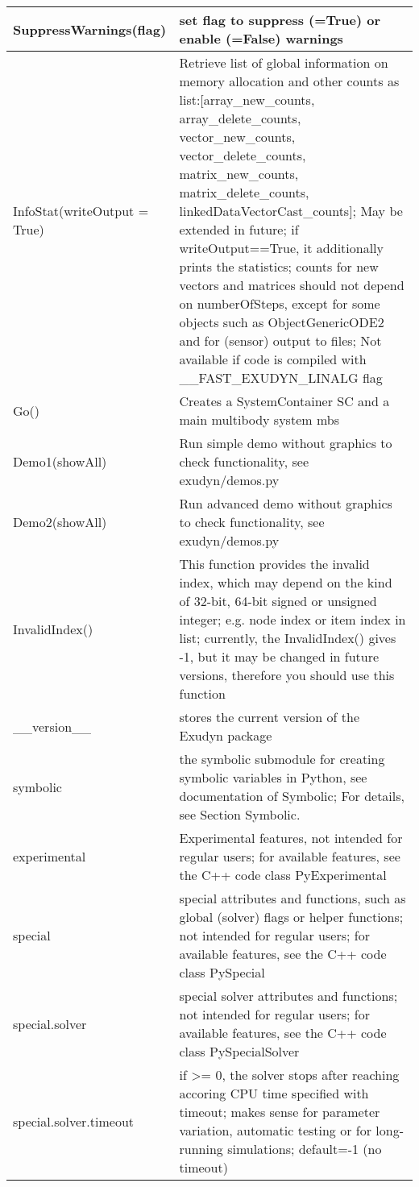 \begin{center}
\begin{longtable}{| p{8cm} | p{8cm} |}
  SuppressWarnings(flag) & set flag to suppress (=True) or enable (=False) warnings\\ \hline 
  InfoStat(writeOutput = True) & Retrieve list of global information on memory allocation and other counts as list:[array\_new\_counts, array\_delete\_counts, vector\_new\_counts, vector\_delete\_counts, matrix\_new\_counts, matrix\_delete\_counts, linkedDataVectorCast\_counts]; May be extended in future; if writeOutput==True, it additionally prints the statistics; counts for new vectors and matrices should not depend on numberOfSteps, except for some objects such as ObjectGenericODE2 and for (sensor) output to files; Not available if code is compiled with \_\_FAST\_EXUDYN\_LINALG flag\\ \hline 
  Go() & Creates a SystemContainer SC and a main multibody system mbs\\ \hline 
  Demo1(showAll) & Run simple demo without graphics to check functionality, see exudyn/demos.py\\ \hline 
  Demo2(showAll) & Run advanced demo without graphics to check functionality, see exudyn/demos.py\\ \hline 
  InvalidIndex() & This function provides the invalid index, which may depend on the kind of 32-bit, 64-bit signed or unsigned integer; e.g. node index or item index in list; currently, the InvalidIndex() gives -1, but it may be changed in future versions, therefore you should use this function\\ \hline 
  \_\_version\_\_ & stores the current version of the Exudyn package\\ \hline  
  symbolic & the symbolic submodule for creating symbolic variables in Python, see documentation of Symbolic; For details, see Section Symbolic.\\ \hline  
  experimental & Experimental features, not intended for regular users; for available features, see the C++ code class PyExperimental\\ \hline  
  special & special attributes and functions, such as global (solver) flags or helper functions; not intended for regular users; for available features, see the C++ code class PySpecial\\ \hline  
  special.solver & special solver attributes and functions; not intended for regular users; for available features, see the C++ code class PySpecialSolver\\ \hline  
  special.solver.timeout & if >= 0, the solver stops after reaching accoring CPU time specified with timeout; makes sense for parameter variation, automatic testing or for long-running simulations; default=-1 (no timeout)\\ \hline  

\end{longtable}
\end{center}
